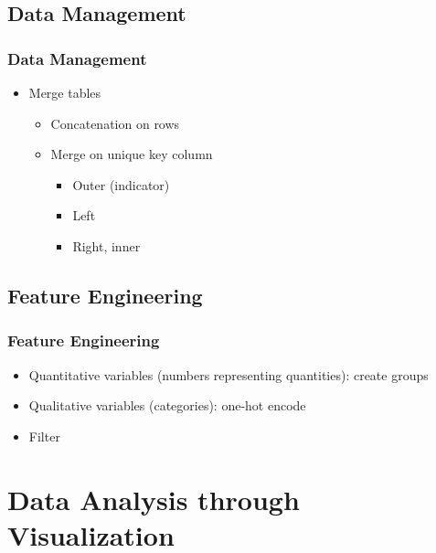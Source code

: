\subsection{Data Management}


\begin{frame}\frametitle{Data Management}
   \begin{itemize}
      \item Merge tables
      \begin{itemize}
         \item Concatenation on rows
         \item Merge on unique key column
         \begin{itemize}
            \item Outer (indicator)
            \item Left
            \item Right, inner
         \end{itemize}
      \end{itemize}
   \end{itemize}
\end{frame}


\subsection{Feature Engineering}

\begin{frame}\frametitle{Feature Engineering}
   \begin{itemize}
      \item Quantitative variables (numbers representing quantities): create groups
      \item Qualitative variables (categories): one-hot encode
      \item Filter
   \end{itemize}
\end{frame}


\section{Data Analysis through Visualization}


